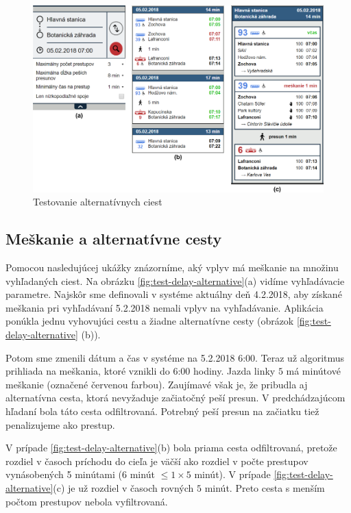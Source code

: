 \begin{figure}[H]
\centerline{\includegraphics[width=1.0\textwidth]{images/test/alternative}}
\caption[Testovanie alternatívnych ciest]{Testovanie alternatívnych ciest}
\label{fig:test-alternative}
\end{figure}

\subsection{Meškanie a alternatívne cesty}
Pomocou nasledujúcej ukážky znázorníme, aký vplyv má meškanie na množinu vyhľadaných ciest. Na obrázku \ref{fig:test-delay-alternative}(a) vidíme vyhľadávacie parametre. Najskôr sme definovali v systéme aktuálny deň 4.2.2018, aby získané meškania pri vyhľadávaní 5.2.2018 nemali vplyv na vyhľadávanie. Aplikácia ponúkla jednu vyhovujúci cestu a žiadne alternatívne cesty (obrázok \ref{fig:test-delay-alternative} (b)). 

Potom sme zmenili dátum a čas v systéme na 5.2.2018 6:00. Teraz už algoritmus prihliada na meškania, ktoré vznikli do 6:00 hodiny. Jazda linky $5$ má minútové meškanie (označené červenou farbou). Zaujímavé však je, že pribudla aj alternatívna cesta, ktorá nevyžaduje začiatočný peší presun. V predchádzajúcom hľadaní bola táto cesta odfiltrovaná. Potrebný peší presun na začiatku tiež penalizujeme ako prestup. 
 
V prípade \ref{fig:test-delay-alternative}(b) bola priama cesta odfiltrovaná, pretože rozdiel v časoch príchodu do cieľa je väčší ako rozdiel v počte prestupov vynásobených 5 minútami ($6$ minút $\leq 1\times5$ minút). V prípade \ref{fig:test-delay-alternative}(c) je už rozdiel v časoch rovných $5$ minút. Preto cesta s menším počtom prestupov nebola vyfiltrovaná.

